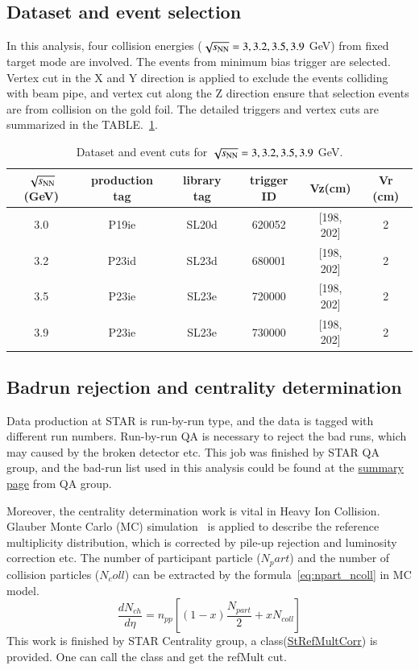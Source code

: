 \subsection{Dataset and event selection}

In this analysis, four collision energies ($\sqrt{s_\text{NN}}=3, 3.2, 3.5, 3.9$ GeV) from fixed target mode are involved.
The events from minimum bias trigger are selected. Vertex cut in the X and Y direction is applied to exclude the events colliding with beam pipe, 
and vertex cut along the Z direction ensure that selection events are from collision on the gold foil.
The detailed triggers and vertex cuts are summarized in the TABLE.~\ref{tab:dataset}.
\begin{table}
\caption{Dataset and event cuts for $\sqrt{s_\text{NN}}=3, 3.2, 3.5, 3.9$ GeV.}
\label{tab:dataset}
\begin{tabular}{|c|c|c|c|c|c|}
\hline
$\sqrt{s_\text{NN}}$(GeV) & production tag & library tag & trigger ID & Vz(cm)     & Vr (cm) \\ \hline
3.0         & P19ie          & SL20d       & 620052     & [198, 202] & 2       \\ \hline
3.2         & P23id          & SL23d       & 680001     & [198, 202] & 2       \\ \hline
3.5         & P23ie          & SL23e       & 720000     & [198, 202] & 2       \\ \hline
3.9         & P23ie          & SL23e       & 730000     & [198, 202] & 2       \\ \hline
\end{tabular}
\end{table}


\subsection{Badrun rejection and centrality determination}

Data production at STAR is run-by-run type, and the data is tagged with different run numbers.
Run-by-run QA is necessary to reject the bad runs, which may caused by the broken detector etc.
This job was finished by STAR QA group, and the bad-run list used in this analysis could be found at the
\href{https://drupal.star.bnl.gov/STAR/pwg/common/bes-ii-run-qa/FXT-datasets}{summary page} from QA group.

Moreover, the centrality determination work is vital in Heavy Ion Collision.
Glauber Monte Carlo (MC) simulation~\cite{KHARZEEV2001121} is applied to describe the reference multiplicity distribution, 
which is corrected by pile-up rejection and luminosity correction etc.
The number of participant particle ($N_part$) and the number of collision particles ($N_coll$)
 can be extracted by the formula~\ref{eq:npart_ncoll} in MC model.
 \begin{equation}
    \frac{d N_{c h}}{d \eta}=n_{p p}\left[(1-x) \frac{N_{p a r t}}{2}+x N_{c o l l}\right]
\label{eq:npart_ncoll}
\end{equation}
This work is finished by STAR Centrality group, a class(\href{https://github.com/star-bnl/star-sw/tree/main/StRoot/StRefMultCorr}{StRefMultCorr}) is provided.
One can call the class and get the refMult cut.



